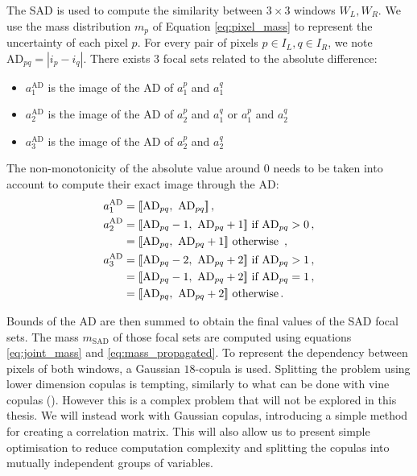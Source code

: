 The SAD is used to compute the similarity between $3\times3$ windows $W_L, W_R$. We use the mass distribution $m_p$ of Equation \eqref{eq:pixel_mass} to represent the uncertainty of each pixel $p$. For every pair of pixels $p\in I_L, q\in I_R$, we note $\mathrm{AD}_{pq}=|i_p - i_q|$. There exists $3$ focal sets related to the absolute difference:
\begin{itemize}
    \item $a^{\mathrm{AD}}_1$ is the image of the AD of $a^p_1$ and $a^q_1$
    \item $a^{\mathrm{AD}}_2$ is the image of the AD of $a^p_2$ and $a^q_1$ or $a^p_1$ and $a^q_2$
    \item  $a^{\mathrm{AD}}_3$ is the image of the AD of $a^p_2$ and $a^q_2$
\end{itemize}
The non-monotonicity of the absolute value around $0$ needs to be taken into account to compute their exact image through the AD:
\begin{align*}
    a^{\mathrm{AD}}_1&=\opi\mathrm{AD}_{pq},~\mathrm{AD}_{pq}\cli\,,\\
    a^{\mathrm{AD}}_2&=\opi\mathrm{AD}_{pq} - 1,~\mathrm{AD}_{pq} + 1\cli\text{ if }\mathrm{AD}_{pq}>0\,,\\
            &=\opi\mathrm{AD}_{pq},~\mathrm{AD}_{pq} + 1\cli\text{ otherwise }\,,\\
    a^{\mathrm{AD}}_3&=\opi\mathrm{AD}_{pq} - 2,~\mathrm{AD}_{pq} + 2\cli\text{ if }\mathrm{AD}_{pq}>1\,,\\
            &=\opi\mathrm{AD}_{pq} - 1,~\mathrm{AD}_{pq} + 2\cli\text{ if }\mathrm{AD}_{pq}=1\,,\\
            &=\opi\mathrm{AD}_{pq},~\mathrm{AD}_{pq} + 2\cli\text{ otherwise}\,.
\end{align*}

Bounds of the AD are then summed to obtain the final values of the SAD focal sets. The mass $m_{\mathrm{SAD}}$ of those focal sets are computed using equations \eqref{eq:joint_mass} and \eqref{eq:mass_propagated}. To represent the dependency between pixels of both windows, a Gaussian $18$-copula is used. Splitting the problem using lower dimension copulas is tempting, similarly to what can be done with vine copulas (\cite{czado_vine_2022}). However this is a complex problem that will not be explored in this thesis. We will instead work with Gaussian copulas, introducing a simple method for creating a correlation matrix. This will also allow us to present simple optimisation to reduce computation complexity and splitting the copulas into mutually independent groups of variables. 

